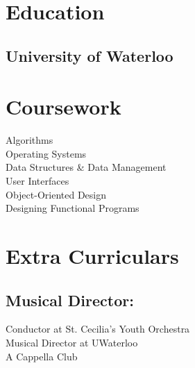 \documentclass[letterpaper]{kevin-resume} %
\begin{document}
\begin{minipage}[t]{0.30\textwidth}



\section{Education} 

\subsection{University of Waterloo}


\sectionspace %


\section{Coursework}

Algorithms \\
Operating Systems \\
Data Structures \& Data Management \\
User Interfaces \\
Object-Oriented Design \\
Designing Functional Programs

\sectionspace %



\section{Extra Curriculars}
\subsection{Musical Director:}
\textbullet{} Conductor at St. Cecilia’s Youth Orchestra \\
\textbullet{} Musical Director at UWaterloo \\A Cappella Club
\sectionspace %

\end{minipage}
\end{document}
